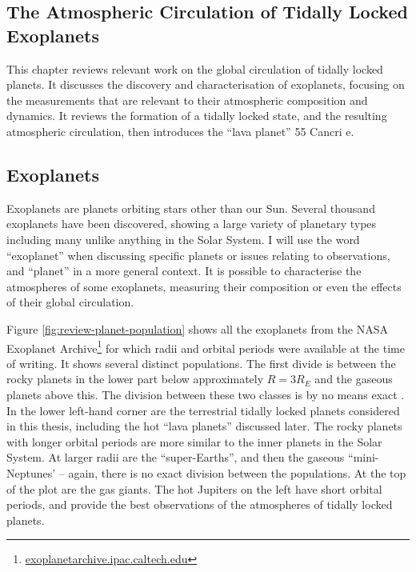 \begin{SingleSpace}
\chapter{The Atmospheric Circulation of Tidally Locked Exoplanets}\label{ch:lava-planets}

\end{SingleSpace}

This chapter reviews relevant work on the global circulation of tidally locked planets. It discusses the discovery and characterisation of exoplanets, focusing on the measurements that are relevant to their atmospheric composition and dynamics. It reviews the formation of a tidally locked state, and the resulting atmospheric circulation, then introduces the ``lava planet'' 55 Cancri e.

\section{Exoplanets}

Exoplanets are planets orbiting stars other than our Sun. Several thousand exoplanets have been discovered, showing a large variety of planetary types including many unlike anything in the Solar System. I will use the word ``exoplanet'' when discussing specific planets or issues relating to observations, and ``planet'' in a more general context. It is possible to characterise the atmospheres of some exoplanets, measuring their composition or even the effects of their global circulation.

Figure \ref{fig:review-planet-population} shows all the exoplanets from the NASA Exoplanet Archive\footnote{\url{exoplanetarchive.ipac.caltech.edu}} for which radii and orbital periods were available at the time of writing. It shows several distinct populations. The first divide is between the rocky planets in the lower part below approximately $R = 3 R_{E}$ and the gaseous planets above this. The division between these two classes is by no means exact \citep{perryman2018exoplanet}. In the lower left-hand corner are the terrestrial tidally locked planets considered in this thesis, including the hot ``lava planets'' discussed later. The rocky planets with longer orbital periods are more similar to the inner planets in the Solar System. At larger radii are the ``super-Earths'', and then the gaseous ``mini-Neptunes' -- again, there is no exact division between the populations. At the top of the plot are the gas giants. The hot Jupiters on the left have short orbital periods, and provide the best observations of the atmospheres of tidally locked planets.

